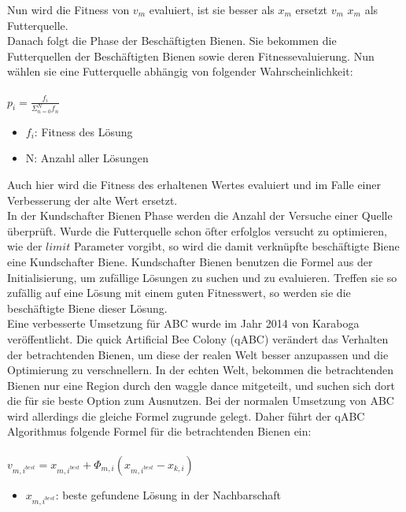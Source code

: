 Nun wird die Fitness von $v_{m}$ evaluiert, ist sie besser als $x_m$ ersetzt $v_m$ $x_m$ als Futterquelle.\\
Danach folgt die Phase der Beschäftigten Bienen. Sie bekommen die Futterquellen der Beschäftigten Bienen sowie deren Fitnessevaluierung.  Nun wählen sie eine Futterquelle abhängig von folgender Wahrscheinlichkeit:\\\\ 
\large
$p_i=\frac{f_i}{\Sigma^N_{n=0}f_n}$
\normalsize
\begin{itemize}
  \item $f_i$: Fitness des Lösung
  \item N: Anzahl aller Lösungen
\end{itemize}
Auch hier wird die Fitness des erhaltenen Wertes evaluiert und im Falle einer Verbesserung der alte Wert ersetzt.\\
In der Kundschafter Bienen Phase werden die Anzahl der Versuche einer Quelle überprüft. Wurde die Futterquelle schon öfter erfolglos versucht zu optimieren, wie der $limit$ Parameter vorgibt, so wird die damit verknüpfte beschäftigte Biene eine Kundschafter Biene. Kundschafter Bienen benutzen die Formel aus der Initialisierung, um zufällige Lösungen zu suchen und zu evaluieren. Treffen sie so  zufällig auf eine Lösung mit einem guten Fitnesswert, so werden sie die beschäftigte Biene dieser Lösung.\\
Eine verbesserte Umsetzung für ABC wurde im Jahr 2014 von Karaboga veröffentlicht. Die quick Artificial Bee Colony (qABC) verändert das Verhalten der betrachtenden Bienen, um diese der realen Welt besser anzupassen und die Optimierung zu verschnellern. In der echten Welt, bekommen die betrachtenden Bienen nur eine Region durch den waggle dance mitgeteilt, und suchen sich dort die für sie beste Option zum Ausnutzen. Bei der normalen Umsetzung von ABC wird allerdings die gleiche Formel zugrunde gelegt. Daher führt der qABC Algorithmus folgende Formel für die betrachtenden Bienen ein:\\\\\large
$v_{m,i^{best}}= x_{m,i^{best}}+\Phi_{m,i}( x_{m,i^{best}}- x_{k,i})$
\normalsize
\begin{itemize}
  \item $x_{m,i^{best}}$: beste gefundene Lösung in der Nachbarschaft
\end{itemize}

